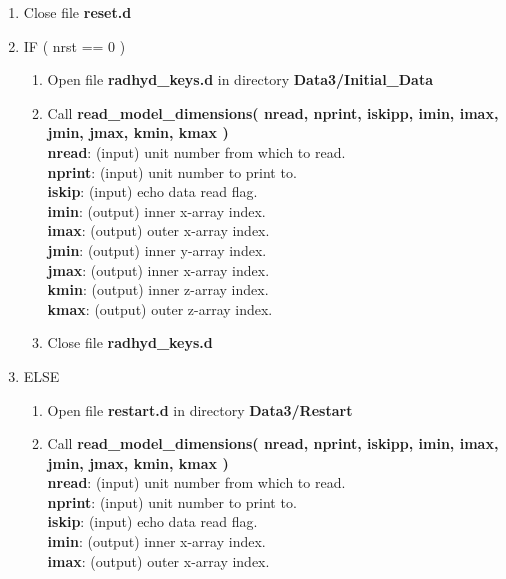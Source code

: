 \documentclass[11pt,doublespace]{article}
\begin{document}
\begin{itemize}
\begin{enumerate}
\begin{enumerate}
  {\bf c\_init\_data}: (output) character array of initial data containing header.\\
  {\bf i\_init\_data}: (output) integer array of initial data containing nrst.\\
  {\bf nrst}: (output) cycle number to start simulation.\\
  {\bf nouttmp}: (output) unit number to get restart data if nrst /= 0 (obsolete).
  \item Close file {\bf reset.d}
  \item IF ( nrst == 0 )
\begin{enumerate}
  \item Open file {\bf radhyd\_keys.d} in directory {\bf Data3/Initial\_Data}
  \item Call {\bf read\_model\_dimensions( nread, nprint, iskipp, imin, imax, jmin, jmax, kmin, kmax )}\\
  {\bf nread}: (input) unit number from which to read.\\
  {\bf nprint}: (input) unit number to print to.\\
  {\bf iskip}: (input) echo data read flag.\\
  {\bf imin}: (output) inner x-array index.\\
  {\bf imax}: (output) outer x-array index.\\
  {\bf jmin}: (output) inner y-array index.\\
  {\bf jmax}: (output) inner x-array index.\\
  {\bf kmin}: (output) inner z-array index.\\
  {\bf kmax}: (output) outer z-array index.
  \item Close file {\bf radhyd\_keys.d}
\end{enumerate}
  \item ELSE
\begin{enumerate}
  \item Open file {\bf restart.d} in directory {\bf Data3/Restart}
  \item Call {\bf read\_model\_dimensions( nread, nprint, iskipp, imin, imax, jmin, jmax, kmin, kmax )}\\
  {\bf nread}: (input) unit number from which to read.\\
  {\bf nprint}: (input) unit number to print to.\\
  {\bf iskip}: (input) echo data read flag.\\
  {\bf imin}: (output) inner x-array index.\\
  {\bf imax}: (output) outer x-array index.\\

\end{enumerate}
\end{enumerate}
\end{enumerate}
\end{itemize}
\end{document}
